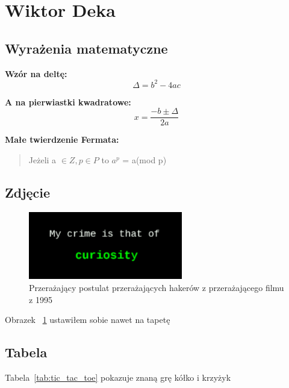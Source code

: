 \section{Wiktor Deka}
\label{sec:Wiktor Deka}

\subsection{Wyrażenia matematyczne}
\textbf{Wzór na deltę: }
\begin{equation}
    \Delta = b^2 - 4ac 
\end{equation}

\noindent \textbf{A na pierwiastki kwadratowe:}
\begin{equation}
x = \frac{-b \pm \Delta}{2a}
\end{equation}

\noindent\textbf{Małe twierdzenie Fermata: }

\begin{quote}
    \begin{center}
        Jeżeli a $\in Z, p \in P$ to $a^p$ =  a(mod p)
    \end{center}
\end{quote}


\subsection{Zdjęcie}
\begin{figure}[htbp]
    \centering
    \includegraphics[width=0.6\textwidth]{pictures/crime.png}
    \caption{Przerażający postulat przerażających hakerów z przerażającego filmu z 1995}
    \label{fig:curiosity}
\end{figure}

Obrazek ~\ref{fig:curiosity} ustawiłem sobie nawet na tapetę

\subsection{Tabela}


Tabela~\ref{tab:tic_tac_toe} pokazuje znaną grę kółko i krzyżyk

